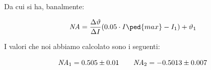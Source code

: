 Da cui si ha, banalmente:

\begin{equation}
    \emph{NA} = \frac{\Delta \vartheta}{\Delta I} (0.05 \cdot I\ped{max} - I_1) + \vartheta_1
\end{equation}

I valori che noi abbiamo calcolato sono i seguenti:

\begin{equation}
    \emph{NA}_1 = 0.505 \pm 0.01 \qquad \emph{NA}_2 = -0.5013 \pm 0.007
\end{equation}
